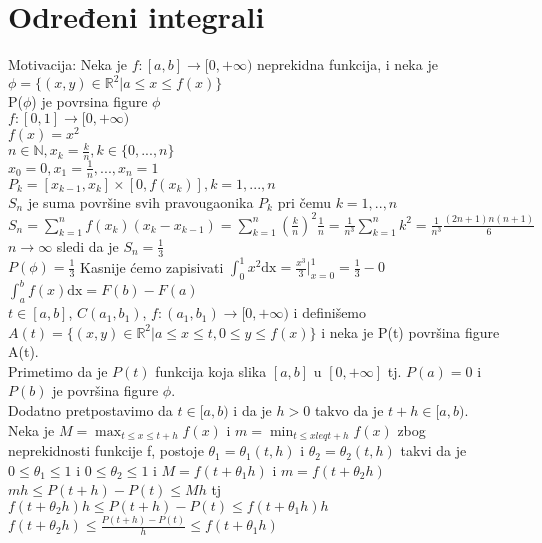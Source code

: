 \documentclass{article}
\begin{document}
\section{Određeni integrali}
Motivacija: Neka je $f: [a,b] \rightarrow [0, +\infty)$ neprekidna funkcija, i neka je $\phi = \{ (x, y) \in \mathbb{R}^2 | a \leq x \leq f(x)\}$\\
P($\phi$) je povrsina figure $\phi$\\
$f: [0, 1] \rightarrow [0, +\infty)$\\
$f(x) = x^2$\\
$n \in \mathbb{N}, x_k = \frac{k}{n}, k \in \{0, ..., n\}$\\
$x_0 = 0, x_1 = \frac{1}{n}, ..., x_n = 1$\\
$P_k = [x_{k-1}, x_k]\times [0, f(x_k)], k=1,...,n$\\
$S_n$ je suma površine svih pravougaonika $P_k$ pri čemu $k = 1,.., n$\\
$\displaystyle S_n = \sum_{k=1}^{n} f(x_k)(x_k - x_{k-1}) = \sum_{k=1}^{n} (\frac{k}{n})^2\frac{1}{n} = \frac{1}{n^3}\sum_{k=1}^n k^2 = \frac{1}{n^3}\frac{(2n+1)n(n+1)}{6}$\\
$n\rightarrow\infty$ sledi da je $S_n = \frac{1}{3}$\\
$P(\phi) = \frac{1}{3}$ Kasnije ćemo zapisivati $\displaystyle \int_0^1 x^2\text{dx} = \frac{x^3}{3} \Bigg|^1_{x=0} = \frac{1}{3} - 0$\\
$\displaystyle \int^b_a f(x)\text{dx} = F(b) - F(a)$\\
$t \in [a, b]$, $C(a_1, b_1)$, $f: (a_1, b_1) \rightarrow [0, +\infty)$ i definišemo $A(t) = \{(x, y) \in \mathbb{R}^2 | a\leq x \leq t, 0\leq y \leq f(x)\}$ i neka je P(t) površina figure A(t).\\
Primetimo da je $P(t)$ funkcija koja slika $[a, b]$ u $[0, +\infty]$ tj. $P(a) = 0$ i $P(b)$ je površina figure $\phi$.\\
Dodatno pretpostavimo da $t \in [a, b)$ i da je $h > 0$ takvo da je $t + h \in [a, b)$.\\
Neka je $\displaystyle M = \max_{t\leq x\leq t+ h} f(x)$ i $m = \min_{t \leq x leq t+h} f(x)$ zbog neprekidnosti funkcije f, postoje $\theta_1 = \theta_1(t, h)$ i $\theta_2 = \theta_2(t, h)$ takvi da je $0\leq \theta_1 \leq 1$ i $0\leq \theta_2 \leq 1$ i $M = f(t + \theta_1h)$ i $m = f(t + \theta_2h)$\\
$m h \leq P(t + h) - P(t) \leq M h$ tj $f(t + \theta_2h)h \leq P(t+h) - P(t) \leq f(t + \theta_1h)h$\\
$f(t+\theta_2h) \leq \frac{P(t + h) - P(t)}{h}\leq f(t+\theta_1h)$\\
\end{document}
